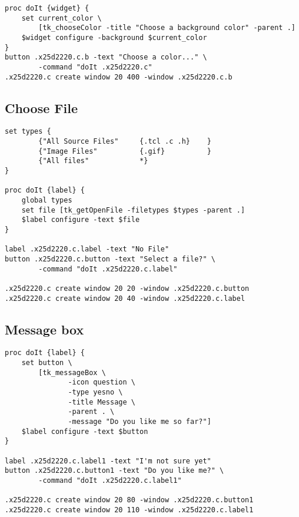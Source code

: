 \begin{lstlisting}
proc doIt {widget} {
    set current_color \
        [tk_chooseColor -title "Choose a background color" -parent .]
    $widget configure -background $current_color
}
button .x25d2220.c.b -text "Choose a color..." \
        -command "doIt .x25d2220.c"
.x25d2220.c create window 20 400 -window .x25d2220.c.b
\end{lstlisting}

\subsection{Choose File}

\begin{lstlisting}
set types {
        {"All Source Files"     {.tcl .c .h}    }
        {"Image Files"          {.gif}          }
        {"All files"            *}
}

proc doIt {label} {
    global types   
    set file [tk_getOpenFile -filetypes $types -parent .]
    $label configure -text $file
}

label .x25d2220.c.label -text "No File"
button .x25d2220.c.button -text "Select a file?" \
        -command "doIt .x25d2220.c.label"

.x25d2220.c create window 20 20 -window .x25d2220.c.button
.x25d2220.c create window 20 40 -window .x25d2220.c.label
\end{lstlisting}

\subsection{Message box}

\begin{lstlisting}
proc doIt {label} {
    set button \
        [tk_messageBox \
               -icon question \
               -type yesno \
               -title Message \
               -parent . \
               -message "Do you like me so far?"]
    $label configure -text $button
}

label .x25d2220.c.label1 -text "I'm not sure yet"
button .x25d2220.c.button1 -text "Do you like me?" \
        -command "doIt .x25d2220.c.label1"

.x25d2220.c create window 20 80 -window .x25d2220.c.button1
.x25d2220.c create window 20 110 -window .x25d2220.c.label1
\end{lstlisting}


